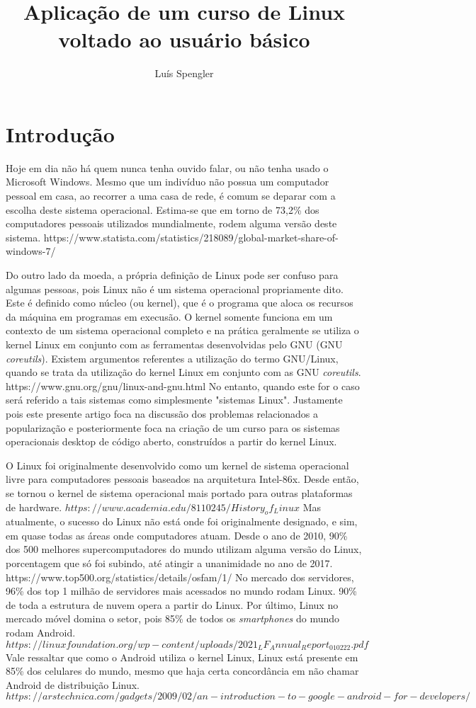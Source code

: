 \documentclass{article}
\author{Luís Spengler}
\title{Aplicação de um curso de Linux voltado ao usuário básico}
\date{}
\begin{document}
\maketitle
\sffamily

\section{Introdução}
Hoje em dia não há quem nunca tenha ouvido falar, ou não tenha usado o Microsoft Windows. Mesmo que um indivíduo não possua um computador pessoal em casa, ao recorrer a uma casa de rede, é comum se deparar com a escolha deste sistema operacional. Estima-se que em torno de 73,2\% dos computadores pessoais utilizados mundialmente, rodem alguma versão deste sistema. https://www.statista.com/statistics/218089/global-market-share-of-windows-7/

Do outro lado da moeda, a própria definição de Linux pode ser confuso para algumas pessoas, pois Linux não é um sistema operacional propriamente dito. Este é definido como núcleo (ou kernel), que é o programa que aloca os recursos da máquina em programas em execusão. O kernel somente funciona em um contexto de um sistema operacional completo e na prática geralmente se utiliza o kernel Linux em conjunto com as ferramentas desenvolvidas pelo GNU (GNU \textit{coreutils}). Existem argumentos referentes a utilização do termo GNU/Linux, quando se trata da utilização do kernel Linux em conjunto com as GNU \textit{coreutils}. https://www.gnu.org/gnu/linux-and-gnu.html No entanto, quando este for o caso será referido a tais sistemas como simplesmente "sistemas Linux". Justamente pois este presente artigo foca na discussão dos problemas relacionados a popularização e posteriormente foca na criação de um curso para os sistemas operacionais desktop de código aberto, construídos a partir do kernel Linux.

O Linux foi originalmente desenvolvido como um kernel de sistema operacional livre para computadores pessoais baseados na arquitetura Intel-86x. Desde então, se tornou o kernel de sistema operacional mais portado para outras plataformas de hardware. \(https://www.academia.edu/8110245/History_of_Linux\) Mas atualmente, o sucesso do Linux não está onde foi originalmente designado, e sim, em quase todas as áreas onde computadores atuam. Desde o ano de 2010, 90\% dos 500 melhores supercomputadores do mundo utilizam alguma versão do Linux, porcentagem que só foi subindo, até atingir a unanimidade no ano de 2017. https://www.top500.org/statistics/details/osfam/1/ No mercado dos servidores, 96\% dos top 1 milhão de servidores mais acessados no mundo rodam Linux. 90\% de toda a estrutura de nuvem opera a partir do Linux. Por último, Linux no mercado móvel domina o setor, pois 85\% de todos os \textit{smartphones} do mundo rodam Android. \(https://linuxfoundation.org/wp-content/uploads/2021_LF_Annual_Report_010222.pdf\) Vale ressaltar que como o Android utiliza o kernel Linux, Linux está presente em 85\% dos celulares do mundo, mesmo que haja certa concordância em não chamar Android de distribuição Linux. \(https://arstechnica.com/gadgets/2009/02/an-introduction-to-google-android-for-developers/\)
\end{document}
